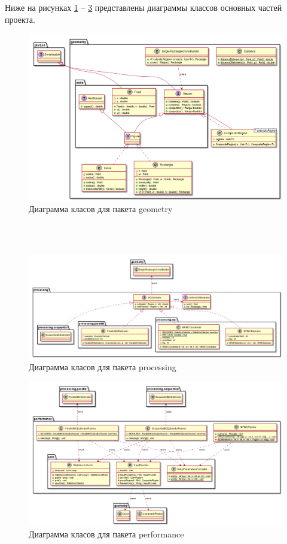 Ниже на рисунках \ref{fig:geometry-class-diagram} -- \ref{fig:geometry-performance-diagram} представлены диаграммы классов основных 
частей проекта. 
\begin{figure}[H]
    \centering
    \includegraphics[width=18cm]{resources/diagrams/01_geometry.png}
    \caption{Диаграмма класов для пакета geometry}
    \label{fig:geometry-class-diagram}
\end{figure}
\\ \hfill \\ \hfill
\begin{figure}[H]
    \centering
    \includegraphics[width=23cm, angle=90]{resources/diagrams/02_processing.png}
    \caption{Диаграмма класов для пакета processing}
    \label{fig:geometry-processing-diagram}
\end{figure}

\begin{figure}[H]
    \centering
    \includegraphics[width=23cm, angle=90]{resources/diagrams/03_performance.png}
    \caption{Диаграмма класов для пакета performance}
    \label{fig:geometry-performance-diagram}
\end{figure}

